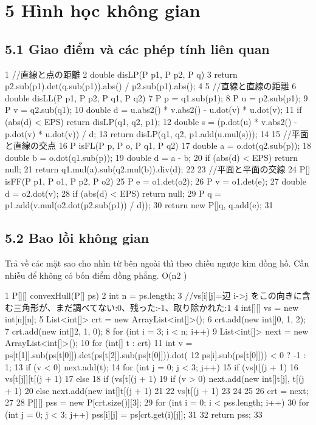 \documentclass[11pt]{article}
\begin{document}
\section{5 Hình học không gian}
\subsection{5.1 Giao điểm và các phép tính liên quan}
\begin{Code}
1 //直線と点の距離
2 double disLP(P p1, P p2, P q) {
3 return p2.sub(p1).det(q.sub(p1)).abs() / p2.sub(p1).abs();
4 }
5 //直線と直線の距離
6 double disLL(P p1, P p2, P q1, P q2) {
7 P p = q1.sub(p1);
8 P u = p2.sub(p1);
9 P v = q2.sub(q1);
10 double d = u.abs2() * v.abs2() - u.dot(v) * u.dot(v);
11 if (abs(d) < EPS) return disLP(q1, q2, p1);
12 double s = (p.dot(u) * v.abs2() - p.dot(v) * u.dot(v)) / d;
13 return disLP(q1, q2, p1.add(u.mul(s)));
14 }
15 //平面と直線の交点
16 P isFL(P p, P o, P q1, P q2) {
17 double a = o.dot(q2.sub(p));
18 double b = o.dot(q1.sub(p));
19 double d = a - b;
20 if (abs(d) < EPS) return null;
21 return q1.mul(a).sub(q2.mul(b)).div(d);
22 }
23 //平面と平面の交線
24 P[] isFF(P p1, P o1, P p2, P o2) {
25 P e = o1.det(o2);
26 P v = o1.det(e);
27 double d = o2.dot(v);
28 if (abs(d) < EPS) return null;
29 P q = p1.add(v.mul(o2.dot(p2.sub(p1)) / d));
30 return new P[]{q, q.add(e)};
31 }
\end{Code}
\subsection{5.2 Bao lồi không gian}
\begin{NoteBlock}
Trả về các mặt sao cho nhìn từ bên ngoài thì theo chiều ngược kim đồng hồ.
Cần nhiễu để không có bốn điểm đồng phẳng.
O(n2
)
\end{NoteBlock}
\begin{Code}
1 P[][] convexHull(P[] ps) {
2 int n = ps.length;
3 //vs[i][j]=辺 i->j をこの向きに含む三角形が、まだ調べてない:0、残った:-1、取り除かれた:1
4 int[][] vs = new int[n][n];
5 List<int[]> crt = new ArrayList<int[]>();
6 crt.add(new int[]{0, 1, 2});
7 crt.add(new int[]{2, 1, 0});
8 for (int i = 3; i < n; i++) {
9 List<int[]> next = new ArrayList<int[]>();
10 for (int[] t : crt) {
11 int v = ps[t[1]].sub(ps[t[0]]).det(ps[t[2]].sub(ps[t[0]])).dot(
12 ps[i].sub(ps[t[0]])) < 0 ? -1 : 1;
13 if (v < 0) next.add(t);
14 for (int j = 0; j < 3; j++) {
15 if (vs[t[(j + 1) %
16 vs[t[j]][t[(j + 1) %
17 } else {
18 if (vs[t[(j + 1) %
19 if (v > 0) next.add(new int[]{t[j], t[(j + 1) %
20 else next.add(new int[]{t[(j + 1) %
21 }
22 vs[t[(j + 1) %
23 }
24 }
25 }
26 crt = next;
27 }
28 P[][] pss = new P[crt.size()][3];
29 for (int i = 0; i < pss.length; i++) {
30 for (int j = 0; j < 3; j++) pss[i][j] = ps[crt.get(i)[j]];
31 }
32 return pss;
33 }
\end{Code}
\end{document}
